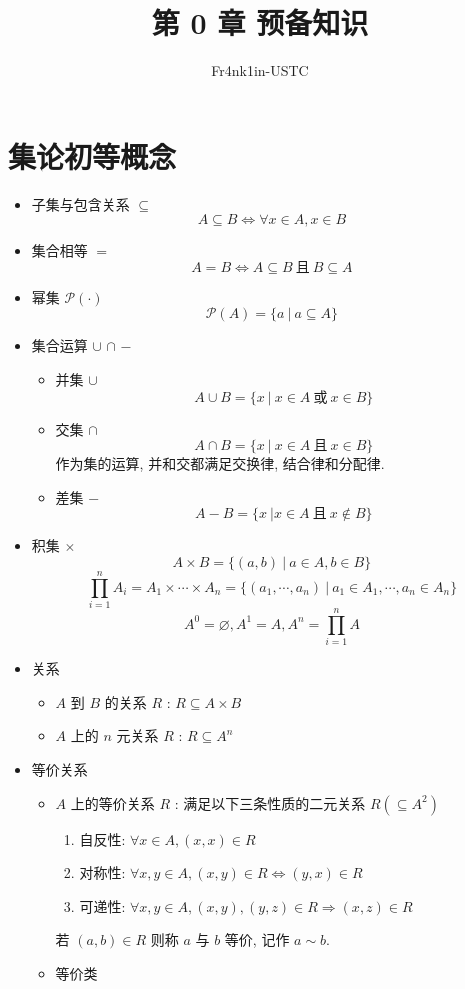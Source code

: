 \documentclass[
    mode=hazy,
    color=blue,
    device=normal,
    lang=cn
]{elegantnote}
\title{第 0 章 预备知识}
\author{Fr4nk1in-USTC}
\institute{中国科学技术大学计算机学院}
\date{\zhtoday}
\begin{document}
    \maketitle
    \section{集论初等概念}
    \begin{itemize}
        \item 子集与包含关系 $\subseteq$
        $$
        A\subseteq B \Leftrightarrow \forall x\in A, x\in B
        $$
        \item 集合相等 $=$
        $$
        A=B \Leftrightarrow A\subseteq B\ \text{且}\ B\subseteq A
        $$
        \item 幂集 $\mathcal{P(\cdot)}$
        $$
        \mathcal{P}(A) = \{a\ \vert\ a\subseteq A\}
        $$
        \item 集合运算 $\cup$ $\cap$ $-$
        \begin{itemize}
            \item 并集 $\cup$
            $$
            A\cup B = \{x\ \vert\ x\in A\ \text{或}\ x \in B\}
            $$
            \item 交集 $\cap$
            $$
            A\cap B = \{x\ \vert\ x\in A\ \text{且}\ x \in B\}
            $$
            作为集的运算, 并和交都满足交换律, 结合律和分配律.
            \item 差集 $-$
            $$
            A-B=\{x\ \vert x\in A\ \text{且}\ x \notin B\}
            $$
        \end{itemize}
        \item 积集 $\times$
        $$
        A\times B = \{(a,b)\ \vert\ a\in A,b \in B\}
        $$
        $$
        \prod_{i=1}^n A_i = A_1\times \cdots \times A_n = \{(a_1, \cdots, a_n)\ \vert\ a_1\in A_1,\cdots, a_n\in A_n\}
        $$
        $$
        A^0 = \varnothing  , A^1 = A, A^n = \prod_{i = 1}^n A
        $$
        \item 关系
        \begin{itemize}
            \item $A$ 到 $B$ 的关系 $R$ : $R\subseteq A\times B$
            \item $A$ 上的 $n$ 元关系 $R$ : $R\subseteq A^n$
        \end{itemize}
        \item 等价关系
        \begin{itemize}
            \item $A$ 上的等价关系 $R$ : 满足以下三条性质的二元关系 $R(\subseteq A^2)$
            \begin{enumerate}[label=$\arabic*^\circ$]
                \item 自反性: $\forall x\in A, (x,x)\in R$
                \item 对称性: $\forall x,y\in A, (x,y)\in R\Leftrightarrow (y,x)\in R$
                \item 可递性: $\forall x,y\in A, (x,y), (y,z)\in R\Rightarrow (x,z)\in R$
            \end{enumerate}
            若 $(a,b)\in R$ 则称 $a$ 与 $b$ 等价, 记作 $a\sim b$.
            \item 等价类
            

\end{itemize}
\end{itemize}
\end{document}
